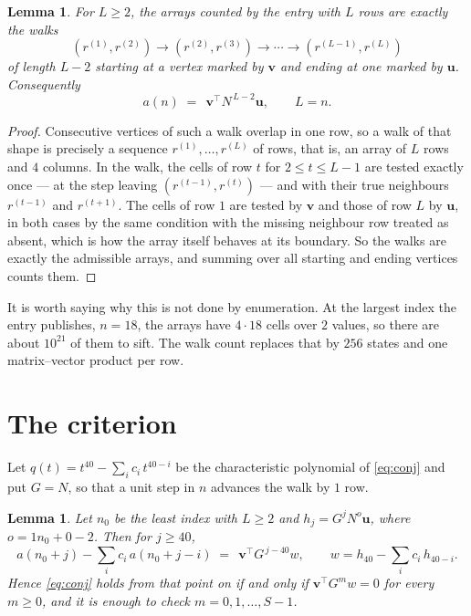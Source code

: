 \documentclass[11pt,a4paper]{article}
\theoremstyle{plain}
\newtheorem{lemma}[theorem]{Lemma}
\theoremstyle{definition}
\begin{document}
\begin{lemma}\label{lem:walk}
For $L\ge2$, the arrays counted by the entry with $L$ rows are exactly the walks
\[
(r^{(1)},r^{(2)})\to(r^{(2)},r^{(3)})\to\cdots\to(r^{(L-1)},r^{(L)})
\]
of length $L-2$ starting at a vertex marked by $\mathbf{v}$ and ending at one marked by
$\mathbf{u}$. Consequently
\[
a(n)\;=\;\,\mathbf{v}^{\!\top}N^{\,L-2}\mathbf{u},\qquad L=n .
\]
\end{lemma}

\begin{proof}
Consecutive vertices of such a walk overlap in one row, so a walk of that shape is
precisely a sequence $r^{(1)},\dots,r^{(L)}$ of rows, that is, an array of $L$ rows
and $4$ columns. In the walk, the cells of row $t$ for $2\le t\le L-1$ are tested
exactly once --- at the step leaving $(r^{(t-1)},r^{(t)})$ --- and with their true
neighbours $r^{(t-1)}$ and $r^{(t+1)}$. The cells of row $1$ are tested by
$\mathbf{v}$ and those of row $L$ by $\mathbf{u}$, in both cases by the same condition
with the missing neighbour row treated as absent, which is how the array itself behaves at
its boundary. So the walks are exactly the admissible arrays, and summing over all starting
and ending vertices counts them.
\end{proof}


It is worth saying why this is not done by enumeration. At the largest index the entry
publishes, $n=18$, the arrays have $4\cdot18$ cells over
$2$ values, so there are about $10^{21}$ of them to sift. The
walk count replaces that by $256$ states and one matrix--vector product per row.
\section{The criterion}

Let $q(t)=t^{40}-\sum_i c_i\,t^{40-i}$ be the characteristic polynomial of
\eqref{eq:conj} and put $G=N$, so that a unit step in $n$ advances the walk by
$1$ row.

\begin{lemma}\label{lem:crit}
Let $n_0$ be the least index with $L\ge2$ and $h_j=G^{j}N^{o}\mathbf{u}$, where
$o=1n_0+0-2$. Then for $j\ge40$,
\[
a(n_0+j)-\sum_i c_i\,a(n_0+j-i)\;=\;\,\mathbf{v}^{\!\top}G^{\,j-40}w,
\qquad w=h_{40}-\sum_i c_i\,h_{40-i} .
\]
Hence \eqref{eq:conj} holds from that point on if and only if
$\mathbf{v}^{\!\top}G^{m}w=0$ for every $m\ge0$, and it is enough to check
$m=0,1,\dots,S-1$.
\end{lemma}
\end{document}
